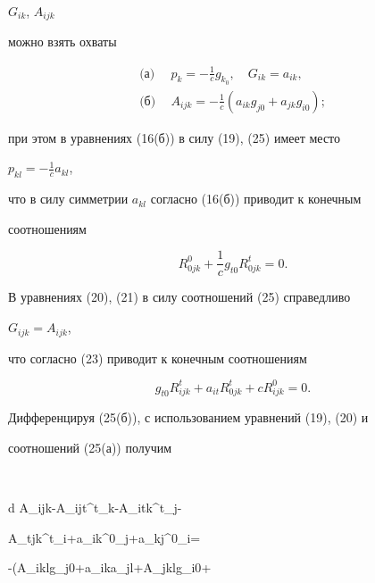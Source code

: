 $G_{ik}$, $A_{ijk}$ 


можно взять охваты 


\begin{equation} 


\begin{split} 


\text{(а)} \ \ & p_k=-\frac{1}{c}g_{k_0},\quad G_{ik}=a_{ik}, \\ 


\text{(б)} \ \ & A_{ijk}=-\frac{1}{c}(a_{ik}g_{j0}+a_{jk}g_{i0});


\end{split} 


\end{equation} 


при этом в уравнениях (16(б)) в силу (19), (25) имеет место 


$p_{kl}=-\frac{1}{c}a_{kl}$, 


что в силу симметрии $a_{kl}$ согласно (16(б)) приводит к конечным 


соотношениям 


\begin{equation} 


R^0_{0jk}+\frac{1}{c}g_{t0}R^t_{0jk}=0. 


\end{equation} 


 


В уравнениях (20), (21) в силу соотношений (25) справедливо 


$G_{ijk}=A_{ijk}$, 


что согласно (23) приводит к конечным соотношениям 


\begin{equation} 


g_{t0}R^t_{ijk}+a_{it}R^t_{0jk}+c R^0_{ijk}=0. 


\end{equation} 


 


Дифференцируя (25(б)), с использованием уравнений (19), (20) и 


соотношений (25(а)) получим 


$$ 


d A_{ijk}-A_{ijt}\omega^t_k-A_{itk}\omega^t_j- 


A_{tjk}\omega^t_i+a_{ik}\omega^0_j+a_{kj}\omega^0_i= 


-(A_{ikl}g_{j0}+a_{ik}a_{jl}+A_{jkl}g_{i0}+ 


